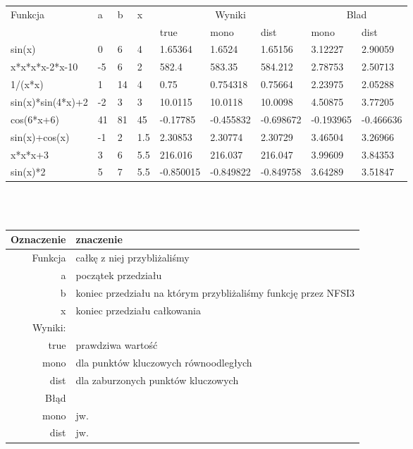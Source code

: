 \begin{table}[h]
  \begin{tabular}{| l | l l l | l l l | l l|}
  \hline
  Funkcja & a & b & x & \multicolumn{3}{|c}{Wyniki} & \multicolumn{2}{|c|}{Blad }\\
  & & & & true & mono & dist & mono & dist \\
  \hline 
sin(x) & 0 & 6 & 4 & 1.65364 & 1.6524 & 1.65156 & 3.12227 & 2.90059\\
x*x*x*x-2*x-10 & -5 & 6 & 2 & 582.4 & 583.35 & 584.212 & 2.78753 & 2.50713\\
1/(x*x) & 1 & 14 & 4 & 0.75 & 0.754318 & 0.75664 & 2.23975 & 2.05288\\
sin(x)*sin(4*x)+2 & -2 & 3 & 3 & 10.0115 & 10.0118 & 10.0098 & 4.50875 & 3.77205\\
cos(6*x+6) & 41 & 81 & 45 & -0.17785 & -0.455832 & -0.698672 & -0.193965 & -0.466636\\
sin(x)+cos(x) & -1 & 2 & 1.5 & 2.30853 & 2.30774 & 2.30729 & 3.46504 & 3.26966\\
x*x*x+3 & 3 & 6 & 5.5 & 216.016 & 216.037 & 216.047 & 3.99609 & 3.84353\\
sin(x)*2 & 5 & 7 & 5.5 & -0.850015 & -0.849822 & -0.849758 & 3.64289 & 3.51847\\
    \hline  
  \end{tabular}\\\\
  \begin{tabular}{r | l}
  Oznaczenie & znaczenie \\
  \hline
  Funkcja & całkę z niej przybliżaliśmy \\
  a & początek przedziału \\
  b & koniec przedziału  na którym przybliżaliśmy funkcję przez NFSI3\\
  x & koniec przedziału całkowania \\
  Wyniki: & \\
  true & prawdziwa wartość \\
  mono & dla punktów kluczowych równoodległych \\
  dist & dla zaburzonych punktów kluczowych \\
  Błąd & \\
  mono & jw. \\
  dist & jw.
  \end{tabular}
\end{table}
